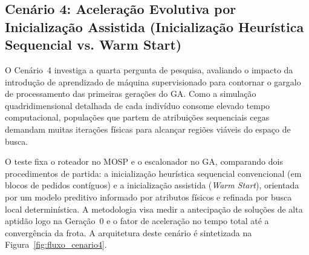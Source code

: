 \subsection{Cenário 4: Aceleração Evolutiva por Inicialização Assistida (Inicialização Heurística Sequencial vs. Warm Start)}\label{sec:cenario4}

O Cenário~4 investiga a quarta pergunta de pesquisa, avaliando o impacto da introdução de aprendizado de máquina supervisionado para contornar o gargalo de processamento das primeiras gerações do GA. Como a simulação quadridimensional detalhada de cada indivíduo consome elevado tempo computacional, populações que partem de atribuições sequenciais cegas demandam muitas iterações físicas para alcançar regiões viáveis do espaço de busca.

O teste fixa o roteador no MOSP e o escalonador no GA, comparando dois procedimentos de partida: a inicialização heurística sequencial convencional (em blocos de pedidos contíguos) e a inicialização assistida (\textit{Warm Start}), orientada por um modelo preditivo informado por atributos físicos e refinada por busca local determinística. A metodologia visa medir a antecipação de soluções de alta aptidão logo na Geração~0 e o fator de aceleração no tempo total até a convergência da frota. A arquitetura deste cenário é sintetizada na Figura~\ref{fig:fluxo_cenario4}.

